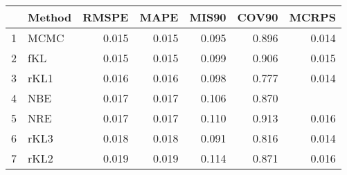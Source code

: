 \documentclass[12pt]{article}
\begin{document}
\thispagestyle{empty}
\begin{table}[ht]
\centering
\begin{tabular}{rlrrrrr}
  \hline
 & Method & RMSPE & MAPE & MIS90 & COV90 & MCRPS \\ 
  \hline
1 & MCMC & 0.015 & 0.015 & 0.095 & 0.896 & 0.014 \\ 
  2 & fKL & 0.015 & 0.015 & 0.099 & 0.906 & 0.015 \\ 
  3 & rKL1 & 0.016 & 0.016 & 0.098 & 0.777 & 0.014 \\ 
  4 & NBE & 0.017 & 0.017 & 0.106 & 0.870 &  \\ 
  5 & NRE & 0.017 & 0.017 & 0.110 & 0.913 & 0.016 \\ 
  6 & rKL3 & 0.018 & 0.018 & 0.091 & 0.816 & 0.014 \\ 
  7 & rKL2 & 0.019 & 0.019 & 0.114 & 0.871 & 0.016 \\ 
   \hline
\end{tabular}
\end{table}
\end{document}
